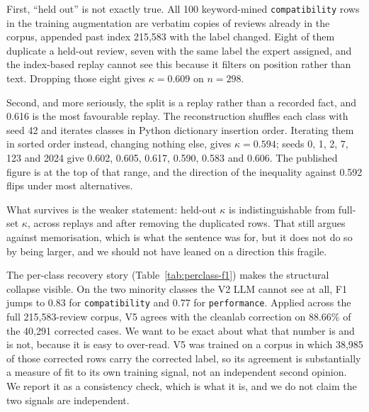 \documentclass[preprint,12pt]{elsarticle}
\begin{document}
First, ``held out'' is not exactly true. All 100 keyword-mined \texttt{compatibility} rows in the
training augmentation are verbatim copies of reviews already in the corpus, appended past index
215{,}583 with the label changed. Eight of them duplicate a held-out review, seven with the same
label the expert assigned, and the index-based replay cannot see this because it filters on
position rather than text. Dropping those eight gives $\kappa = 0.609$ on $n = 298$.

Second, and more seriously, the split is a replay rather than a recorded fact, and 0.616 is the
most favourable replay. The reconstruction shuffles each class with seed 42 and iterates classes
in Python dictionary insertion order. Iterating them in sorted order instead, changing nothing
else, gives $\kappa = 0.594$; seeds 0, 1, 2, 7, 123 and 2024 give 0.602, 0.605, 0.617, 0.590,
0.583 and 0.606. The published figure is at the top of that range, and the direction of the
inequality against 0.592 flips under most alternatives.

What survives is the weaker statement: held-out $\kappa$ is indistinguishable from full-set
$\kappa$, across replays and after removing the duplicated rows. That still argues against
memorisation, which is what the sentence was for, but it does not do so by being larger, and we
should not have leaned on a direction this fragile.

The per-class recovery story (Table~\ref{tab:perclass-f1}) makes the structural collapse visible. On the two minority classes the V2 LLM cannot see at all, F1 jumps to 0.83 for \texttt{compatibility} and 0.77 for \texttt{performance}. Applied across the full 215{,}583-review corpus, V5 agrees with the cleanlab correction on
88.66\% of the 40{,}291 corrected cases. We want to be exact about what that number is and is
not, because it is easy to over-read. V5 was trained on a corpus in which 38{,}985 of those
corrected rows carry the corrected label, so its agreement is substantially a measure of fit to
its own training signal, not an independent second opinion. We report it as a consistency check,
which is what it is, and we do not claim the two signals are independent.
\end{document}
